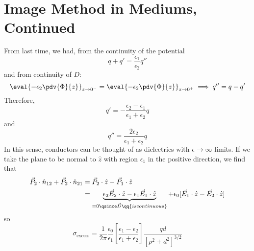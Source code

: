 \documentclass[a4paper,twoside,master.tex]{subfiles}
\begin{document}
\section{Image Method in Mediums, Continued}
\label{sec:image_method_in_mediums}

From last time, we had, from the continuity of the potential
\begin{equation}
    q + q' = \frac{\epsilon_1}{\epsilon_2} q''
\end{equation}
and from continuity of $ D $:
\begin{equation}
    \eval{- \epsilon_2 \pdv{\Phi}{z}}_{z \to 0^-} = \eval{- \epsilon_2 \pdv{\Phi}{z}}_{z \to 0^+} \implies q'' = q - q' 
\end{equation}
Therefore,
\begin{equation}
    q' = - \frac{\epsilon_2 - \epsilon_1}{\epsilon_{1} + \epsilon_{2}} q
\end{equation}
and
\begin{equation}
    q'' = \frac{2 \epsilon_{2}}{ \epsilon_{1} + \epsilon_{2}} q
\end{equation}
In this sense, conductors can be thought of as dielectrics with $ \epsilon \to \infty $ limits. If we take the plane to be normal to $ \hat{z} $ with region $ \epsilon_{1} $ in the positive direction, we find that
\begin{align}
    \vec{P}_{2} \cdot \hat{n}_{12} + \vec{P}_{2} \cdot \hat{n}_{21} &= \vec{P}_{2} \cdot \hat{z} - \vec{P}_{1} \cdot \hat{z}\\
    &= \underbrace{\epsilon_{2} \vec{E}_{2} \cdot \hat{z} - \epsilon_{1} \vec{E}_{1} \cdot \hat{z}}_{=0 \qsince \vec{D} \qq{is continuous}} + \epsilon_0 [ \vec{E}_{1} \cdot \hat{z} - \vec{E}_{2} \cdot \hat{z} ]
\end{align}
so
\begin{equation}
    \sigma_{\text{excess}} = \frac{1}{2 \pi} \frac{\epsilon_0}{\epsilon_1} \left[ \frac{\epsilon_1 - \epsilon_2}{\epsilon_1 + \epsilon_2} \right] \frac{qd}{[\rho^2 + d^2 ]^{3/2}}
\end{equation}
\end{document}
